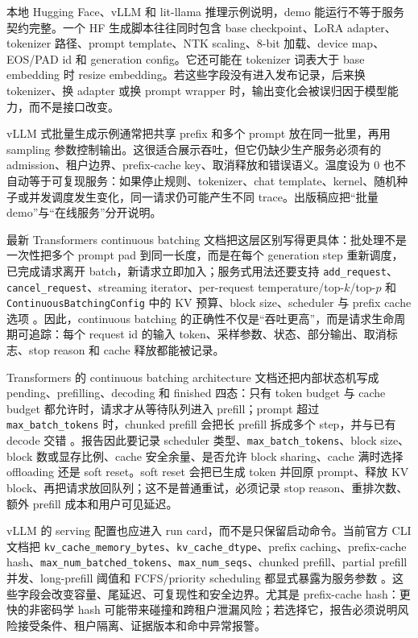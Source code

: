 \documentclass[UTF8,zihao=-4,openany]{ctexbook}
\begin{document}
本地 Hugging Face、vLLM 和 lit-llama 推理示例说明，demo 能运行不等于服务契约完整。一个 HF 生成脚本往往同时包含 base checkpoint、LoRA adapter、tokenizer 路径、prompt template、NTK scaling、8-bit 加载、device map、EOS/PAD id 和 generation config。它还可能在 tokenizer 词表大于 base embedding 时 resize embedding。若这些字段没有进入发布记录，后来换 tokenizer、换 adapter 或换 prompt wrapper 时，输出变化会被误归因于模型能力，而不是接口改变。

vLLM 式批量生成示例通常把共享 prefix 和多个 prompt 放在同一批里，再用 sampling 参数控制输出。这很适合展示吞吐，但它仍缺少生产服务必须有的 admission、租户边界、prefix-cache key、取消释放和错误语义。温度设为 0 也不自动等于可复现服务：如果停止规则、tokenizer、chat template、kernel、随机种子或并发调度发生变化，同一请求仍可能产生不同 trace。出版稿应把“批量 demo”与“在线服务”分开说明。

最新 Transformers continuous batching 文档把这层区别写得更具体：批处理不是一次性把多个 prompt pad 到同一长度，而是在每个 generation step 重新调度，已完成请求离开 batch，新请求立即加入；服务式用法还要支持 \texttt{add\_request}、\texttt{cancel\_request}、streaming iterator、per-request temperature/top-$k$/top-$p$ 和 \texttt{ContinuousBatchingConfig} 中的 KV 预算、block size、scheduler 与 prefix cache 选项 \cite{huggingface2026continuousbatching}。因此，continuous batching 的正确性不仅是“吞吐更高”，而是请求生命周期可追踪：每个 request id 的输入 token、采样参数、状态、部分输出、取消标志、stop reason 和 cache 释放都能被记录。

Transformers 的 continuous batching architecture 文档还把内部状态机写成 pending、prefilling、decoding 和 finished 四态：只有 token budget 与 cache budget 都允许时，请求才从等待队列进入 prefill；prompt 超过 \texttt{max\_batch\_tokens} 时，chunked prefill 会把长 prefill 拆成多个 step，并与已有 decode 交错 \cite{huggingface2026continuousbatchingarchitecture}。报告因此要记录 scheduler 类型、\texttt{max\_batch\_tokens}、block size、block 数或显存比例、cache 安全余量、是否允许 block sharing、cache 满时选择 offloading 还是 soft reset。soft reset 会把已生成 token 并回原 prompt、释放 KV block、再把请求放回队列；这不是普通重试，必须记录 stop reason、重排次数、额外 prefill 成本和用户可见延迟。

vLLM 的 serving 配置也应进入 run card，而不是只保留启动命令。当前官方 CLI 文档把 \texttt{kv\_cache\_memory\_bytes}、\texttt{kv\_cache\_dtype}、prefix caching、prefix-cache hash、\texttt{max\_num\_batched\_tokens}、\texttt{max\_num\_seqs}、chunked prefill、partial prefill 并发、long-prefill 阈值和 FCFS/priority scheduling 都显式暴露为服务参数 \cite{vllm2026servecli}。这些字段会改变容量、尾延迟、可复现性和安全边界。尤其是 prefix-cache hash：更快的非密码学 hash 可能带来碰撞和跨租户泄漏风险；若选择它，报告必须说明风险接受条件、租户隔离、证据版本和命中异常报警。
\end{document}
